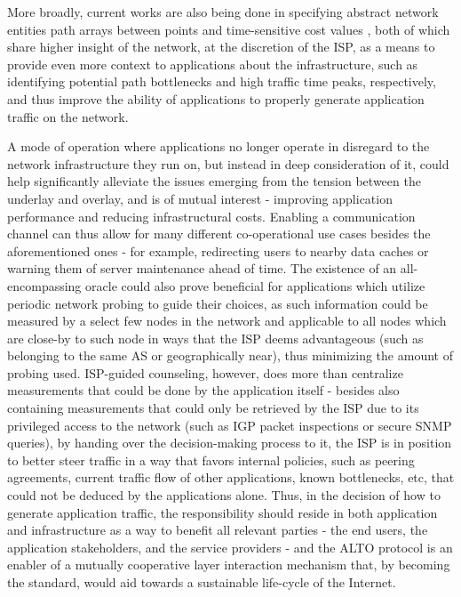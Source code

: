         More broadly, current works are also being done in specifying abstract network entities path arrays between points \cite{alto-path-vector(draft)} and time-sensitive cost values \cite{alto-calendar-cost-map(draft)}, both of which share higher insight of the network, at the discretion of the ISP, as a means to provide even more context to applications about the infrastructure, such as identifying potential path bottlenecks and high traffic time peaks, respectively, and thus improve the ability of applications to properly generate application traffic on the network.

        A mode of operation where applications no longer operate in disregard to the network infrastructure they run on, but instead in deep consideration of it, could help significantly alleviate the issues emerging from the tension between the underlay and overlay, and is of mutual interest - improving application performance and reducing infrastructural costs.
        Enabling a communication channel can thus allow for many different co-operational use cases besides the aforementioned ones - for example, redirecting users to nearby data caches or warning them of server maintenance ahead of time.
        The existence of an all-encompassing oracle could also prove beneficial for applications which utilize periodic network probing to guide their choices, as such information could be measured by a select few nodes in the network and applicable to all nodes which are close-by to such node in ways that the ISP deems advantageous (such as belonging to the same AS or geographically near), thus minimizing the amount of probing used.
        ISP-guided counseling, however, does more than centralize measurements that could be done by the application itself - besides also containing measurements that could only be retrieved by the ISP due to its privileged access to the network (such as IGP packet inspections or secure SNMP queries), by handing over the decision-making process to it, the ISP is in position to better steer traffic in a way that favors internal policies, such as peering agreements, current traffic flow of other applications, known bottlenecks, etc, that could not be deduced by the applications alone.
        Thus, in the decision of how to generate application traffic, the responsibility should reside in both application and infrastructure as a way to benefit all relevant parties - the end users, the application stakeholders, and the service providers - and the ALTO protocol is an enabler of a mutually cooperative layer interaction mechanism that, by becoming the standard, would aid towards a sustainable life-cycle of the Internet.

